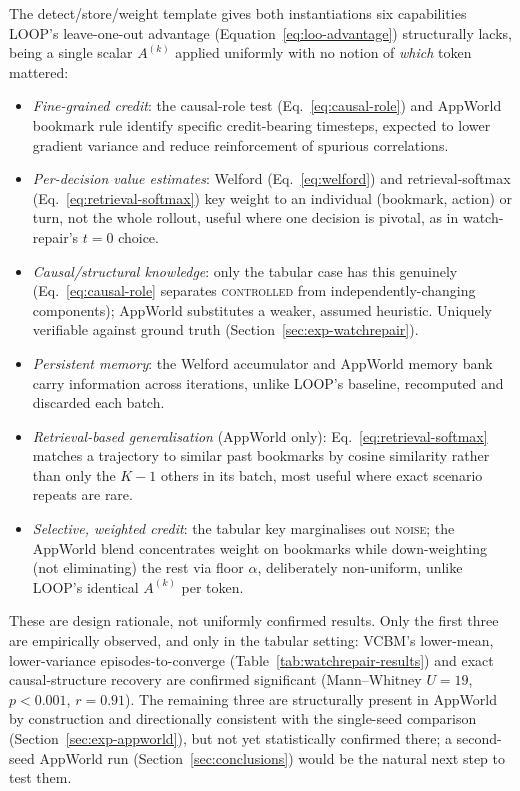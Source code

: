 \documentclass[conference]{IEEEtran}
\begin{document}
The detect/store/weight template gives both instantiations six capabilities LOOP's leave-one-out advantage (Equation~\eqref{eq:loo-advantage}) structurally lacks, being a single scalar $A^{(k)}$ applied uniformly with no notion of \emph{which} token mattered:
\begin{itemize}
  \item \emph{Fine-grained credit}: the causal-role test (Eq.~\eqref{eq:causal-role}) and AppWorld bookmark rule identify specific credit-bearing timesteps, expected to lower gradient variance and reduce reinforcement of spurious correlations.
  \item \emph{Per-decision value estimates}: Welford (Eq.~\eqref{eq:welford}) and retrieval-softmax (Eq.~\eqref{eq:retrieval-softmax}) key weight to an individual (bookmark, action) or turn, not the whole rollout, useful where one decision is pivotal, as in watch-repair's $t{=}0$ choice.
  \item \emph{Causal/structural knowledge}: only the tabular case has this genuinely (Eq.~\eqref{eq:causal-role} separates \textsc{controlled} from independently-changing components); AppWorld substitutes a weaker, assumed heuristic. Uniquely verifiable against ground truth (Section~\ref{sec:exp-watchrepair}).
  \item \emph{Persistent memory}: the Welford accumulator and AppWorld memory bank carry information across iterations, unlike LOOP's baseline, recomputed and discarded each batch.
  \item \emph{Retrieval-based generalisation} (AppWorld only): Eq.~\eqref{eq:retrieval-softmax} matches a trajectory to similar past bookmarks by cosine similarity rather than only the $K-1$ others in its batch, most useful where exact scenario repeats are rare.
  \item \emph{Selective, weighted credit}: the tabular key marginalises out \textsc{noise}; the AppWorld blend concentrates weight on bookmarks while down-weighting (not eliminating) the rest via floor $\alpha$, deliberately non-uniform, unlike LOOP's identical $A^{(k)}$ per token.
\end{itemize}
These are design rationale, not uniformly confirmed results. Only the first three are empirically observed, and only in the tabular setting: VCBM's lower-mean, lower-variance episodes-to-converge (Table~\ref{tab:watchrepair-results}) and exact causal-structure recovery are confirmed significant (Mann--Whitney $U=19$, $p<0.001$, $r=0.91$). The remaining three are structurally present in AppWorld by construction and directionally consistent with the single-seed comparison (Section~\ref{sec:exp-appworld}), but not yet statistically confirmed there; a second-seed AppWorld run (Section~\ref{sec:conclusions}) would be the natural next step to test them.
\end{document}
